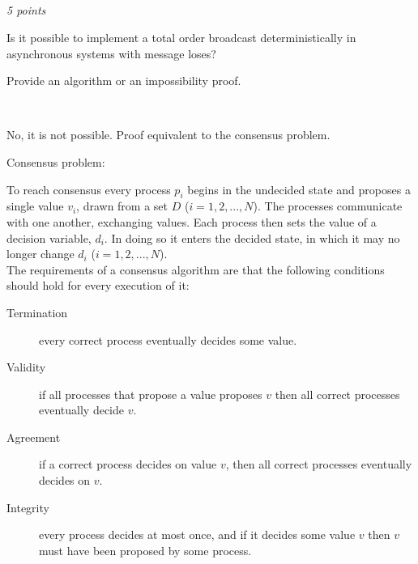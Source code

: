 \documentclass[a4paper]{article}
\newcommand{\points}[1]{\subsection{} \textit{#1 points}\\}
\newcommand{\question}[2][]{
  \parbox[t]{\textwidth}{
    \ifthenelse{\equal{#1}{}}{}{#1)}
    \parbox[t]{0.95\textwidth}{#2}}\\}
\newcommand{\solution}[2][]{
  \ifthenelse{\equal{#1}{} \or \equal{#1}{a}}{\\[3pt]\textit{Solution: }\\[0.1cm]}{}
  \parbox[t]{\textwidth}{
    \ifthenelse{\equal{#1}{}}{}{#1)}
    \parbox[t]{0.95\textwidth}{#2}}\\
}
\begin{document}
{  
}


\points{5}
\question{
  Is it possible to implement a total order broadcast
  deterministically in asynchronous systems with message loses?

  Provide an algorithm or an impossibility proof.
}
\solution{
  No, it is not possible. Proof equivalent to the consensus problem.

  Consensus problem:

  To reach consensus every process $p_i$ begins in the undecided
  state and proposes a single value $v_i$, drawn from a set $D$ ($i =
  1, 2, ..., N$). The processes communicate with one another,
  exchanging values. Each process then sets the value of a decision
  variable, $d_i$. In doing so it enters the decided state, in which
  it may no longer change $d_i$ ($i = 1, 2, ..., N$). \\

  The requirements of a consensus algorithm are that the following
  conditions should hold for every execution of it:
  \begin{description}
    \item[Termination] every correct process eventually decides some
      value.
    \item[Validity] if all processes that propose a value proposes $v$
      then all correct processes eventually decide $v$.
    \item[Agreement] if a correct process decides on value $v$, then
      all correct processes eventually decides on $v$.
    \item[Integrity] every process decides at most once, and if it
      decides some value $v$ then $v$ must have been proposed by some
      process.
  \end{description}

}
\end{document}
